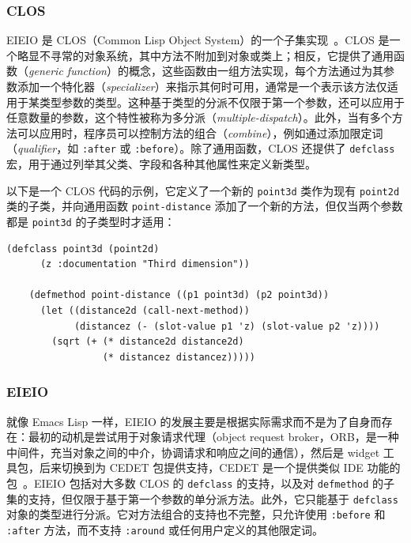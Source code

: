 \documentclass[format=acmsmall,screen]{acmart}
\begin{document}
\subsubsection{CLOS}

EIEIO 是 CLOS（Common Lisp Object System）的一个子集实现~\cite{DeMichielGabriel1987}。CLOS 是一个略显不寻常的对象系统，其中方法不附加到对象或类上；相反，它提供了通用函数（\emph{generic function}）的概念，这些函数由一组方法实现，每个方法通过为其参数添加一个特化器（\emph{specializer}）来指示其何时可用，通常是一个表示该方法仅适用于某类型参数的类型。这种基于类型的分派不仅限于第一个参数，还可以应用于任意数量的参数，这个特性被称为多分派（\emph{multiple-dispatch}）。此外，当有多个方法可以应用时，程序员可以控制方法的组合（\emph{combine}），例如通过添加限定词（\emph{qualifier}，如 \texttt{:after} 或 \texttt{:before}）。除了通用函数，CLOS 还提供了 \texttt{defclass} 宏，用于通过列举其父类、字段和各种其他属性来定义新类型。

以下是一个 CLOS 代码的示例，它定义了一个新的 \texttt{point3d} 类作为现有 \texttt{point2d} 类的子类，并向通用函数 \texttt{point-distance} 添加了一个新的方法，但仅当两个参数都是 \texttt{point3d} 的子类型时才适用：
\begin{Verbatim}[samepage=true]
    (defclass point3d (point2d)
      (z :documentation "Third dimension"))

    (defmethod point-distance ((p1 point3d) (p2 point3d))
      (let ((distance2d (call-next-method))
            (distancez (- (slot-value p1 'z) (slot-value p2 'z))))
        (sqrt (+ (* distance2d distance2d)
                 (* distancez distancez)))))
\end{Verbatim}

\subsubsection{EIEIO}

就像 Emacs Lisp 一样，EIEIO 的发展主要是根据实际需求而不是为了自身而存在：最初的动机是尝试用于对象请求代理（object request broker，ORB，是一种中间件，充当对象之间的中介，协调请求和响应之间的通信），然后是 widget 工具包，后来切换到为 CEDET 包提供支持，CEDET 是一个提供类似 IDE 功能的包~\cite{Ludlam18}。EIEIO 包括对大多数 CLOS 的 \texttt{defclass} 的支持，以及对 \texttt{defmethod} 的子集的支持，但仅限于基于第一个参数的单分派方法。此外，它只能基于 \texttt{defclass} 对象的类型进行分派。它对方法组合的支持也不完整，只允许使用 \texttt{:before} 和 \texttt{:after} 方法，而不支持 \texttt{:around} 或任何用户定义的其他限定词。
\end{document}
